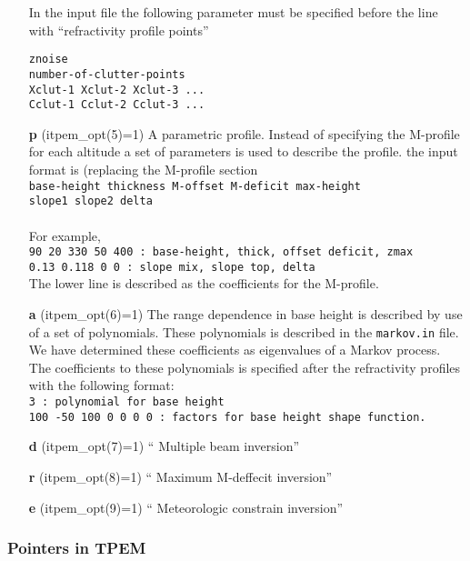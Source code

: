 \documentclass{saclantc}
\begin{document}
\begin{itemize}
In the input file the following parameter must be specified before 
the line with  ``refractivity profile points'' 

{\tt              znoise}\\
{\tt number-of-clutter-points     }\\
{\tt Xclut-1  Xclut-2  Xclut-3 ...}\\
{\tt Cclut-1  Cclut-2 Cclut-3  ... }\\

 \item[\bf p]  (itpem\_opt(5)=1) A parametric profile. Instead of specifying the M-profile
 for each altitude a set of parameters is used to describe the
 profile. the input format is (replacing the M-profile section\\
{\tt base-height thickness M-offset M-deficit max-height  }\\
{\tt slope1 slope2 delta}\\
\\
For example,\\
{\tt 90 20 330 50 400 : base-height, thick, offset deficit, zmax}\\
{\tt 0.13 0.118 0 0  : slope mix, slope top, delta}\\

The lower line is described as the coefficients for the M-profile.

\item[\bf a] (itpem\_opt(6)=1)
The range dependence in base height is described by use of a set of
polynomials. These polynomials is described in the  {\tt markov.in}
file. We have determined these coefficients as eigenvalues of a Markov
process.
The coefficients to these polynomials is specified after the
refractivity profiles with the following format:\\
{\tt 3                   : polynomial for base height}\\
{\tt 100 -50 100  0 0 0 0   : factors for base height shape function.}\\

\item[\bf d] (itpem\_opt(7)=1) `` Multiple beam inversion''
\item[\bf r] (itpem\_opt(8)=1) `` Maximum M-deffecit inversion''
\item[\bf e] (itpem\_opt(9)=1) `` Meteorologic constrain inversion''

\end{itemize}

\subsubsection{Pointers in TPEM}
\label{se:tpempoint}
\end{document}

